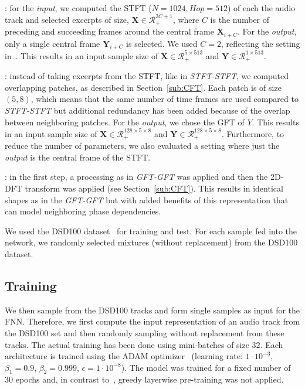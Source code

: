 \begin{description}[style=unboxed,leftmargin=0cm]
\item[STFT-STFT]: for the \emph{input}, we computed the \acs{STFT} (\(N=1024, Hop=512\)) of each the audio track and selected excerpts of size, \(\mathbf{X} \in \mathcal{R}^{2C + 1}_{+} \), where \(C\) is the number of preceding and succeeding frames around the central frame \(\mathbf{X}_{i+C}\). For the \emph{output}, only a single central frame \(\mathbf{Y}_{i+C}\) is selected.
We used \(C=2\), reflecting the setting in~\cite{uhlich15}. This results in an input sample size of \(\mathbf{X} \in \mathcal{R}_{+}^{5 \times 513}\) and  \(\mathbf{Y} \in \mathcal{R}_{+}^{1 \times 513}\).

\item[GFT-GFT/GFT-STFT]: instead of taking excerpts from the \acs{STFT}, like in \emph{STFT-STFT}, we computed overlapping patches, as described in Section~\ref{sub:CFT}. Each patch is of size \((5, 8)\), which means that the same number of time frames are used compared to \emph{STFT-STFT} but additional redundancy has been added because of the overlap between neighboring patches.
For the \emph{output}, we chose the GFT of \(Y\).
This results in an input sample size of \(\mathbf{X} \in \mathcal{R}_{+}^{128 \times 5 \times 8}\) and  \(\mathbf{Y} \in \mathcal{R}_{+}^{128 \times 5 \times 8}\).
Furthermore, to reduce the number of parameters, we also evaluated a setting where just the \emph{output} is the central frame of the STFT.

\item[CFT-CFT/CFT-STFT]: in the first step, a processing as in \emph{GFT-GFT} was applied and then the 2D-DFT transform was applied (see Section~\ref{sub:CFT}).
This results in identical shapes as in the \emph{GFT-GFT} but with added benefits of this representation that can model neighboring phase dependencies.
\end{description}

We used the DSD100 dataset~\cite{ono15} for training and test. 
For each sample fed into the network, we randomly selected mixtures (without replacement) from the DSD100 dataset.

\subsection{Training}
We then sample from the DSD100 tracks and form single samples as input for the \acs{FNN}.
Therefore, we first compute the input representation of an audio track from the DSD100 set and then randomly sampling without replacement from these tracks.
The actual training has been done using mini-batches of size 32.
Each architecture is trained using the ADAM optimizer~\cite{kingma14} (learning rate: \(1 \cdot 10^{-3}\), \(\beta_1=0.9\), \(\beta_2=0.999\), \(\epsilon=1 \cdot 10^{-8}\)).
The model was trained for a fixed number of 30 epochs and, in contrast to~\cite{uhlich15}, greedy layerwise pre-training was not applied.


